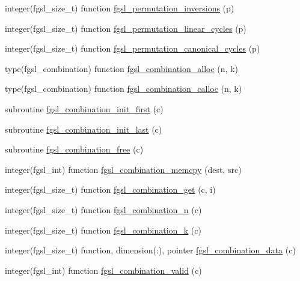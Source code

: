 \begin{DoxyCompactItemize}
\item 
integer(fgsl\+\_\+size\+\_\+t) function \hyperlink{permutation_8finc_a85618d9acd677b30eca1256709554b17}{fgsl\+\_\+permutation\+\_\+inversions} (p)
\item 
integer(fgsl\+\_\+size\+\_\+t) function \hyperlink{permutation_8finc_a78568007bb7b73908f8307fa61483e3e}{fgsl\+\_\+permutation\+\_\+linear\+\_\+cycles} (p)
\item 
integer(fgsl\+\_\+size\+\_\+t) function \hyperlink{permutation_8finc_ad00f45e6a50f6b3fd1954fa3f09bcf91}{fgsl\+\_\+permutation\+\_\+canonical\+\_\+cycles} (p)
\item 
type(fgsl\+\_\+combination) function \hyperlink{permutation_8finc_ace565683aa9ef2635c53b2efe6afeee6}{fgsl\+\_\+combination\+\_\+alloc} (n, k)
\item 
type(fgsl\+\_\+combination) function \hyperlink{permutation_8finc_ab0fd8e6b594d8dbd95fb23f8e911f9c4}{fgsl\+\_\+combination\+\_\+calloc} (n, k)
\item 
subroutine \hyperlink{permutation_8finc_a3f234450ae639a2a5f1ee57b3e735dde}{fgsl\+\_\+combination\+\_\+init\+\_\+first} (c)
\item 
subroutine \hyperlink{permutation_8finc_a46a310ddadb5f2d35a7a6b3dd652c9cb}{fgsl\+\_\+combination\+\_\+init\+\_\+last} (c)
\item 
subroutine \hyperlink{permutation_8finc_a5621600a730419e48e135d3c165fd12d}{fgsl\+\_\+combination\+\_\+free} (c)
\item 
integer(fgsl\+\_\+int) function \hyperlink{permutation_8finc_a8c1ed815e15adea5c5eca5a54b74901d}{fgsl\+\_\+combination\+\_\+memcpy} (dest, src)
\item 
integer(fgsl\+\_\+size\+\_\+t) function \hyperlink{permutation_8finc_a1c9f6ecd2ddf2782907a5b1338553b62}{fgsl\+\_\+combination\+\_\+get} (c, i)
\item 
integer(fgsl\+\_\+size\+\_\+t) function \hyperlink{permutation_8finc_a999499c6e216c3cbf8c8eb2cc35efc8b}{fgsl\+\_\+combination\+\_\+n} (c)
\item 
integer(fgsl\+\_\+size\+\_\+t) function \hyperlink{permutation_8finc_ab7fad8757dc445fdd0b66b005d27e619}{fgsl\+\_\+combination\+\_\+k} (c)
\item 
integer(fgsl\+\_\+size\+\_\+t) function, dimension(\+:), pointer \hyperlink{permutation_8finc_af802fe7025690ec09c892e4a358e58ee}{fgsl\+\_\+combination\+\_\+data} (c)
\item 
integer(fgsl\+\_\+int) function \hyperlink{permutation_8finc_a32ca51968e7eaf13df7d34b23dd948b5}{fgsl\+\_\+combination\+\_\+valid} (c)

\end{DoxyCompactItemize}
